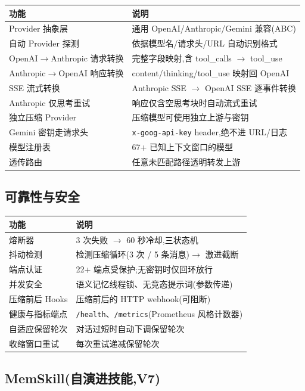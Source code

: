 \documentclass[11pt,a4paper]{article}
\begin{document}
\begin{longtable}{@{}lp{10cm}@{}}
  \toprule
  功能 & 说明 \\
  \midrule
  Provider 抽象层 & 通用 OpenAI/Anthropic/Gemini 兼容(ABC) \\
  自动 Provider 探测 & 依据模型名/请求头/URL 自动识别格式 \\
  OpenAI$\rightarrow$Anthropic 请求转换 & 完整字段映射,含 tool\_calls $\rightarrow$ tool\_use \\
  Anthropic$\rightarrow$OpenAI 响应转换 & content/thinking/tool\_use 映射回 OpenAI \\
  SSE 流式转换 & Anthropic SSE $\rightarrow$ OpenAI SSE 逐事件转换 \\
  Anthropic 仅思考重试 & 响应仅含空思考块时自动流式重试 \\
  独立压缩 Provider & 压缩模型可使用独立上游与密钥 \\
  Gemini 密钥走请求头 & \texttt{x-goog-api-key} header,绝不进 URL/日志 \\
  模型注册表 & 67+ 已知上下文窗口的模型 \\
  透传路由 & 任意未匹配路径透明转发上游 \\
  \bottomrule
\end{longtable}

\subsection{可靠性与安全}

\begin{longtable}{@{}lp{10cm}@{}}
  \toprule
  功能 & 说明 \\
  \midrule
  熔断器 & 3 次失败 $\rightarrow$ 60 秒冷却,三状态机 \\
  抖动检测 & 检测压缩循环(3 次 / 5 条消息)$\rightarrow$ 激进截断 \\
  端点认证 & 22+ 端点受保护;无密钥时仅回环放行 \\
  并发安全 & 语义记忆线程锁、无竞态提示词(参数传递) \\
  压缩前后 Hooks & 压缩前后的 HTTP webhook(可阻断) \\
  健康与指标端点 & \texttt{/health}、\texttt{/metrics}(Prometheus 风格计数器) \\
  自适应保留轮次 & 对话过短时自动下调保留轮次 \\
  收缩窗口重试 & 每次重试递减保留轮次 \\
  \bottomrule
\end{longtable}

\subsection{MemSkill(自演进技能,V7)}
\end{document}
